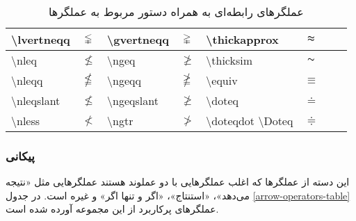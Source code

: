 \begin{table}
\begin{latin}
\begin{tabular}{|l|c||l|c||l|c||l|c|}
\textbackslash lvertneqq	&	$\lvertneqq$&	\textbackslash gvertneqq	&	$\gvertneqq$&	\textbackslash thickapprox	&	$\thickapprox$&								&				\\ \hline
\textbackslash nleq			&	$\nleq$		& 	\textbackslash ngeq 		&	$\ngeq$		&	\textbackslash thicksim  	& 	$\thicksim$	&								&				\\ \hline
\textbackslash nleqq		&	$\nleqq$	& 	\textbackslash ngeqq 		&	$\ngeqq$	&	\textbackslash equiv		&	$\equiv$	&								&				\\ \hline
\textbackslash nleqslant	&	$\nleqslant$&	\textbackslash ngeqslant 	&	$\ngeqslant$&	\textbackslash doteq		&	$\doteq$	&								&				\\ \hline
\textbackslash nless		&	$\nless$	&	\textbackslash ngtr			&	$\ngtr$		&	\textbackslash doteqdot  \rl{یا} \textbackslash Doteq		&	$\doteqdot$	&								&				\\ \hline
\end{tabular}
\end{latin}
\caption{عملگرهای رابطه‌ای به همراه دستور مربوط به عملگرها}
\label{relational-operators-table}
\end{table}

\subsubsection{پیکانی}
این دسته از عملگرها که اغلب عملگرهایی با دو عملوند هستند عملگرهایی مثل «نتیجه
می‌دهد»، «استنتاج»، «اگر و تنها اگر» و غیره است. در جدول \ref{arrow-operators-table} عملگرهای
پرکاربرد از این مجموعه آورده شده است.

